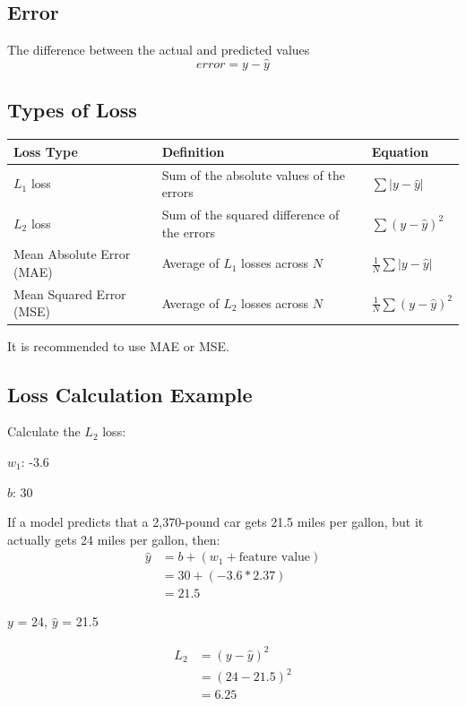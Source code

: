 \documentclass[a4paper,12pt]{article}
\begin{document}
\subsection{Error}
The difference between the actual and predicted values
\begin{equation}
error = y - \hat{y}
\end{equation}

\subsection{Types of Loss}
\begin{center}
\begin{tabularx}{\textwidth}{@{}lXl@{}}
\toprule
Loss Type & Definition & Equation \\ 
\midrule
$L_1$ loss & Sum of the absolute values of the errors & $\sum |y - \hat{y}|$ \\
$L_2$ loss & Sum of the squared difference of the errors & $\sum (y - \hat{y})^2$ \\
Mean Absolute Error (MAE) & Average of $L_1$ losses across $N$ & $ \frac{1}{N} \sum |y - \hat{y}|$ \\
Mean Squared Error (MSE) & Average of $L_2$ losses across $N$ & $ \frac{1}{N} \sum (y - \hat{y})^2$ \\
\bottomrule
\end{tabularx}
\end{center}

\noindent It is recommended to use MAE or MSE.

\subsection{Loss Calculation Example}
Calculate the $L_2$ loss:

$w_1$: -3.6

$b$: 30

\noindent If a model predicts that a 2,370-pound car gets 21.5 miles per gallon, but it actually gets 24 miles per gallon, then:
\begin{align}
\hat{y} &= b + (w_1 + \text{feature value}) \\
       &= 30 + (-3.6 * 2.37) \\ &= 21.5
\end{align}

\noindent $y$ = 24, $\hat{y}$ = 21.5

\begin{align}
L_2 &= (y - \hat{y})^2 \\
    &= (24 - 21.5)^2 \\
    &= 6.25
\end{align}
\end{document}
